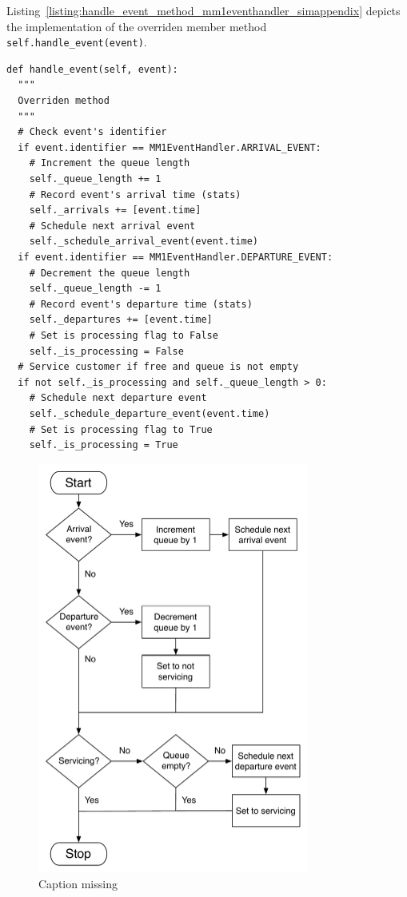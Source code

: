 Listing~\ref{listing:handle_event_method_mm1eventhandler_simappendix} depicts the implementation of the overriden member method \lstinline{self.handle_event(event)}.

\begin{lstlisting}[caption=\lstinline{self.handle_event(event)} member method of the \lstinline{MM1EventHandler} class, label=listing:handle_event_method_mm1eventhandler_simappendix]
def handle_event(self, event):
  """
  Overriden method
  """
  # Check event's identifier
  if event.identifier == MM1EventHandler.ARRIVAL_EVENT:
    # Increment the queue length
    self._queue_length += 1
    # Record event's arrival time (stats)
    self._arrivals += [event.time]
    # Schedule next arrival event
    self._schedule_arrival_event(event.time)
  if event.identifier == MM1EventHandler.DEPARTURE_EVENT:
    # Decrement the queue length
    self._queue_length -= 1
    # Record event's departure time (stats)
    self._departures += [event.time]
    # Set is processing flag to False
    self._is_processing = False
  # Service customer if free and queue is not empty
  if not self._is_processing and self._queue_length > 0:
    # Schedule next departure event
    self._schedule_departure_event(event.time)
    # Set is processing flag to True
    self._is_processing = True
\end{lstlisting}

\begin{figure}
  \includegraphics[width=3.5in]{Appendices/Figures/mm1_handle_event}
  \caption{Caption missing}
  \label{fig:mm1_handle_event_simappendix}
\end{figure}

